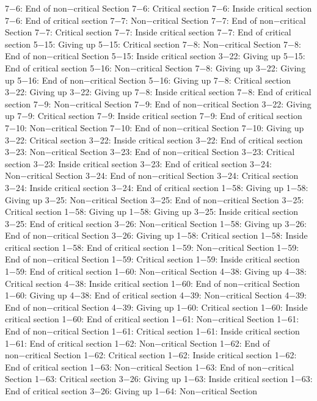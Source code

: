 7−6: End of non−critical Section
7−6: Critical section
7−6: Inside critical section
7−6: End of critical section
7−7: Non−critical Section
7−7: End of non−critical Section
7−7: Critical section
7−7: Inside critical section
7−7: End of critical section
5−15: Giving up
5−15: Critical section
7−8: Non−critical Section
7−8: End of non−critical Section
5−15: Inside critical section
3−22: Giving up
5−15: End of critical section
5−16: Non−critical Section
7−8: Giving up
3−22: Giving up
5−16: End of non−critical Section
5−16: Giving up
7−8: Critical section
3−22: Giving up
3−22: Giving up
7−8: Inside critical section
7−8: End of critical section
7−9: Non−critical Section
7−9: End of non−critical Section
3−22: Giving up
7−9: Critical section
7−9: Inside critical section
7−9: End of critical section
7−10: Non−critical Section
7−10: End of non−critical Section
7−10: Giving up
3−22: Critical section
3−22: Inside critical section
3−22: End of critical section
3−23: Non−critical Section
3−23: End of non−critical Section
3−23: Critical section
3−23: Inside critical section
3−23: End of critical section
3−24: Non−critical Section
3−24: End of non−critical Section
3−24: Critical section
3−24: Inside critical section
3−24: End of critical section
1−58: Giving up
1−58: Giving up
3−25: Non−critical Section
3−25: End of non−critical Section
3−25: Critical section
1−58: Giving up
1−58: Giving up
3−25: Inside critical section
3−25: End of critical section
3−26: Non−critical Section
1−58: Giving up
3−26: End of non−critical Section
3−26: Giving up
1−58: Critical section
1−58: Inside critical section
1−58: End of critical section
1−59: Non−critical Section
1−59: End of non−critical Section
1−59: Critical section
1−59: Inside critical section
1−59: End of critical section
1−60: Non−critical Section
4−38: Giving up
4−38: Critical section
4−38: Inside critical section
1−60: End of non−critical Section
1−60: Giving up
4−38: End of critical section
4−39: Non−critical Section
4−39: End of non−critical Section
4−39: Giving up
1−60: Critical section
1−60: Inside critical section
1−60: End of critical section
1−61: Non−critical Section
1−61: End of non−critical Section
1−61: Critical section
1−61: Inside critical section
1−61: End of critical section
1−62: Non−critical Section
1−62: End of non−critical Section
1−62: Critical section
1−62: Inside critical section
1−62: End of critical section
1−63: Non−critical Section
1−63: End of non−critical Section
1−63: Critical section
3−26: Giving up
1−63: Inside critical section
1−63: End of critical section
3−26: Giving up
1−64: Non−critical Section
